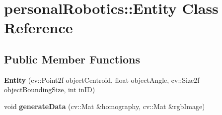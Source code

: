 \hypertarget{classpersonal_robotics_1_1_entity}{}\section{personal\+Robotics\+:\+:Entity Class Reference}
\label{classpersonal_robotics_1_1_entity}
\subsection*{Public Member Functions}
\begin{DoxyCompactItemize}
\item 
\hypertarget{classpersonal_robotics_1_1_entity_a996b6edd9f9c618ae014a67fcce25544}{}{\bfseries Entity} (cv\+::\+Point2f object\+Centroid, float object\+Angle, cv\+::\+Size2f object\+Bounding\+Size, int in\+I\+D)\label{classpersonal_robotics_1_1_entity_a996b6edd9f9c618ae014a67fcce25544}

\item 
\hypertarget{classpersonal_robotics_1_1_entity_a25a613851cce4319f8ba83a8a3161c7f}{}void {\bfseries generate\+Data} (cv\+::\+Mat \&homography, cv\+::\+Mat \&rgb\+Image)\label{classpersonal_robotics_1_1_entity_a25a613851cce4319f8ba83a8a3161c7f}

\end{DoxyCompactItemize}
